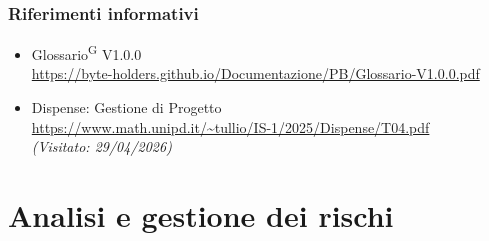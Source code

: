 \documentclass[a4paper, 11pt]{article}
\newcommand{\lastVisited}[3]{\textit{(Visitato: #1/#2/#3)}}
\begin{document}
\subsubsection{Riferimenti informativi}
\begin{itemize}
  \item
	Glossario\textsuperscript{G} V1.0.0\\
	\url{https://byte-holders.github.io/Documentazione/PB/Glossario-V1.0.0.pdf}
  \item
  	Dispense: Gestione di Progetto\\
  	\url{https://www.math.unipd.it/~tullio/IS-1/2025/Dispense/T04.pdf}\\
  	\lastVisited{29}{04}{2026}
\end{itemize}

\newpage

\section{Analisi e gestione dei rischi}
\end{document}

